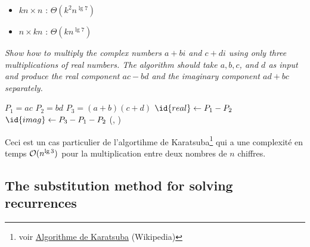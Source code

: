 \begin{description}
    \begin{exrev}
      
    \end{exrev}


    \begin{ex}   %
      \begin{itemize}
        \item $kn \times n$ : $\Theta(k^2 n^{\lg 7})$
        \item $n \times kn$ : $\Theta(kn^{\lg 7})$
      \end{itemize}
    \end{ex}

   {\itshape Show how to multiply the complex numbers $a + bi$ and $c + di$ using only three multiplications of real numbers. The algorithm should take $a, b, c$, and $d$ as input and produce the real component $ac-bd$ and the imaginary component $ad + bc$ separately.}
    \begin{ex}
      \begin{codebox}%
        \li $P_1 = ac$
        \li $P_2 = bd$
        \li $P_3 = (a+b)(c+d)$
        \li $\id{real} \gets P_1 - P_2$
        \li $\id{imag} \gets P_3-P_1-P_2$
        \li \Return (, )
      \end{codebox}

      Ceci est un cas particulier de l'algortihme de Karatsuba\footnote{voir \href{https://en.wikipedia.org/wiki/Karatsuba_algorithm}{Algorithme de Karatsuba} (Wikipedia)} qui a une complexit\'e en temps $\mathcal{O}(n^{\lg 3})$ pour la multiplication entre deux nombres de $n$ chiffres.

    \end{ex}

\end{description}

\subsection{The substitution method for solving recurrences}

